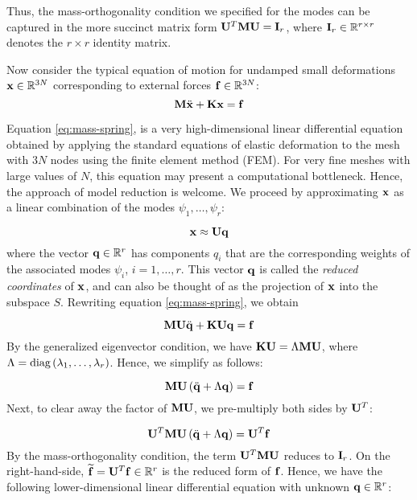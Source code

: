 Thus, the mass-orthogonality condition we specified for the modes can be captured in the more succinct matrix form $\mathbf{U}^{T} \mathbf{M} \mathbf{U} = \mathbf{I}_r$,
where $\mathbf{I}_r \in \mathbb{R}^{r \times r}$ denotes the $r \times r$ identity matrix.

Now consider the typical equation of motion for undamped small deformations $\mathbf{x} \in \mathbb{R}^{3N}$ corresponding to external forces $\mathbf{f} \in \mathbb{R}^{3N}$: 
\begin{equation}
\label{eq:mass-spring}
\mathbf{M} \ddot{\mathbf{x}} + \mathbf{K} \mathbf{x} = \mathbf{f}
\end{equation}

Equation \ref{eq:mass-spring}, is a very high-dimensional linear differential equation obtained by applying the standard equations of elastic deformation to the mesh with $3N$ nodes using the finite element method (FEM). For very fine meshes with large values of $N$, this equation may present a computational bottleneck. Hence, the approach of model reduction is welcome. We proceed by approximating $\mathbf{x}$ as a linear combination of the modes $\psi_1, \dots, \psi_r$:

\begin{equation}
\mathbf{x} \approx \mathbf{U} \mathbf{q}
\end{equation}
where the vector $\mathbf{q} \in \mathbb{R}^{r}$ has components $q_i$ that are the corresponding weights of the associated modes $\psi_i$, $i=1,\dots,r$. This vector $\mathbf{q}$ is called the {\em reduced coordinates} of $\mathbf{x}$, and can also be thought of as the projection of $\mathbf{x}$ into the subspace $S$. Rewriting equation \ref{eq:mass-spring}, we obtain

\begin{equation}
\mathbf{M} {\mathbf{U} \ddot{\mathbf{q}}} + \mathbf{K} \mathbf{U} \mathbf{q} = \mathbf{f}
\end{equation}
By the generalized eigenvector condition, we have $\mathbf{K} \mathbf{U} = \Lambda \mathbf{M} \mathbf{U}$, where $\Lambda = \textnormal{diag}\left(\lambda_1, \dots, \lambda_r\right)$. Hence, we simplify as follows:

\begin{equation}
\mathbf{M} \mathbf{U} \left(\ddot{\mathbf{q}} + \Lambda \mathbf{q}\right) = \mathbf{f}
\end{equation}
Next, to clear away the factor of $\mathbf{M} \mathbf{U}$, we pre-multiply both sides by $\mathbf{U}^{T}$:

\begin{equation}
\mathbf{U}^{T} \mathbf{M} \mathbf{U} \left(\ddot{\mathbf{q}} + \Lambda \mathbf{q}\right)= \mathbf{U}^{T} \mathbf{f}
\end{equation}
By the mass-orthogonality condition, the term $\mathbf{U}^{T} \mathbf{M} \mathbf{U}$ reduces to $\mathbf{I}_r$.  On the right-hand-side, $\widetilde{\mathbf{f}} = \mathbf{U}^{T} \mathbf{f} \in \mathbb{R}^r$ is the reduced form of $\mathbf{f}$. Hence, we have the following lower-dimensional linear differential equation with unknown $\mathbf{q} \in \mathbb{R}^{r}$:

